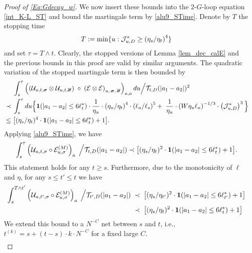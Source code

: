 \documentclass[10pt,reqno]{article}
\theoremstyle{plain} %
\theoremstyle{remark}
\numberwithin{equation}{section}
\begin{document}
\begin{proof}[Proof of \eqref{Eq:Gdecay_w}]
We now insert  these bounds   into the $2$-$G$-loop equation \eqref{int_K-L_ST} and 
bound  the martingale term by \eqref{alu9_STime}.
Denote by $T$ the stopping time 
\begin{align}
T:=\min \{u: {\cal J}^*_{u,D} \ge \left(\eta_s / \eta_t\right)^4\}
\end{align}
and set $\tau = T \wedge t$. 
Clearly, the stopped versions of Lemma \ref{lem_dec_calE} and the previous bounds in this proof are valid by similar arguments. 
The quadratic variation of the stopped  martingale term is then bounded by 
\begin{align}\label{51}
& \int_s^\tau  \left( \left(\mathcal{U}_{u,t,  \boldsymbol{\sigma}}
   \otimes 
   \mathcal{U}_{u, t,  \overline{\boldsymbol{\sigma}}}
   \right) \;\circ  \;
   \left( \mathcal{E} \otimes  \mathcal{E}  \right)
   _{u, \,\boldsymbol{\sigma},\, \overline{\boldsymbol{\sigma}} }
   \right)_{{\textbf a}, {\textbf a}}  d u
 \Big/{\cal T}_{t, D}(|a_1-a_2|)^2  \nonumber \\
 \;\prec \; &   \int_s^\tau   d u \Big \{ 
 {\bf1}(|a_1-a_2|
\le 6\ell_t^*)\cdot  \frac{1} {\eta_u} \cdot \left(\eta_u / \eta_t\right)^4\cdot \left(\ell_u / \ell_s\right)^5 
+ \;  \frac{1}{\eta_u} 
  \cdot
       \left(W \eta_u \ell_u\right)^{-1/3}  \cdot \left({\cal J}^{*}_{u,D} \right)^{3 }  \Big \}   \nonumber \\
\;\le \; &    \big [ (\eta_s/\eta_t)^{4}  \cdot {\bf 1}(|a_1-a_2|\le 6\ell_t^*)+1 \big ].
 \end{align}
Applying  \eqref{alu9_STime}, we have 
 $$
 \int_s^\tau\left(\mathcal{U}_{u, t, \sigma} \circ \mathcal{E}_{u, \sigma}^{(M)}\right)_{\textbf{a}}\;\Big/{\cal T}_{t, D}(|a_1-a_2|)
 \prec \big [ (\eta_s/\eta_t)^{2}  \cdot {\bf 1}(|a_1-a_2|\le 6\ell_t^*)+1 \big ].
 $$
 This statement holds for any $t\ge s$. Furthermore, due to the monotonicity of $\ell$ and $\eta$, for any $s\le t'\le t$ we have
\begin{align}\label{bsluwous1}
  \int_s^{T\wedge t'}\left(\mathcal{U}_{u,t', \sigma} \circ \mathcal{E}_{u, \sigma}^{(M)}\right)_{\textbf{a}}\;\Big/{\cal T}_{t', D}(|a_1-a_2|)
   & \; \prec \; \big [ (\eta_s/\eta_{t'})^{2}  \cdot {\bf 1}(|a_1-a_2|\le 6\ell_{t'}^*)+1 \big ]
 \\\nonumber
  & \; \prec \;  \big [ (\eta_s/\eta_{t })^{2}  \cdot {\bf 1}(|a_1-a_2|\le 6\ell_{t }^*)+1 \big ]
 \end{align}
 We extend this bound to a $N^{-C}$ net between $s$ and $t$, i.e., $t^{(k)}=s+(t-s)\cdot k\cdot N^{-C}$   for a fixed large $C$.  
 \begin{align}\label{bsluwous2}

\end{align}
\end{proof}
\end{document}
